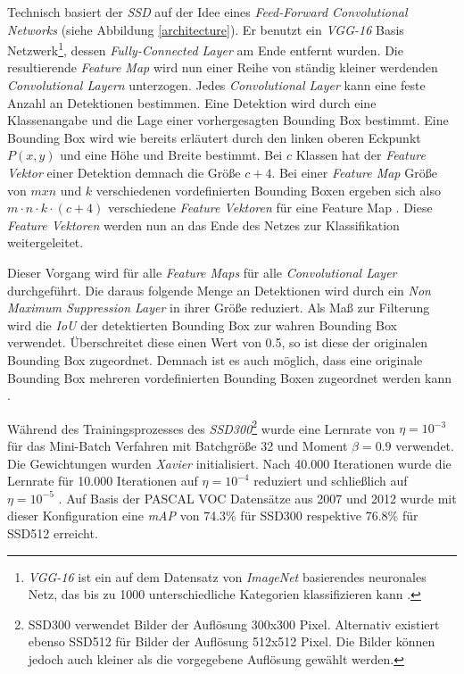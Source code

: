 Technisch basiert der \textit{SSD} auf der Idee eines \textit{Feed-Forward Convolutional Networks} (siehe Abbildung \ref{architecture}). Er benutzt ein \textit{VGG-16} Basis Netzwerk\footnote{\textit{VGG-16} ist ein auf dem Datensatz von \textit{ImageNet} basierendes neuronales Netz, das bis zu 1000 unterschiedliche Kategorien klassifizieren kann \cite{MathWorks.2019b}.}, dessen \textit{Fully-Connected Layer} am Ende entfernt wurden. Die resultierende \textit{Feature Map} wird nun einer Reihe von ständig kleiner werdenden \textit{Convolutional Layern} unterzogen. Jedes \textit{Convolutional Layer} kann eine feste Anzahl an Detektionen bestimmen. Eine Detektion wird durch eine Klassenangabe und die Lage einer vorhergesagten Bounding Box bestimmt. Eine Bounding Box wird wie bereits erläutert durch den linken oberen Eckpunkt $P(x,y)$ und eine Höhe und Breite bestimmt. Bei $c$ Klassen hat der \textit{Feature Vektor} einer Detektion demnach die Größe $c+4$. Bei einer \textit{Feature Map} Größe von $m x n$ und $k$ verschiedenen vordefinierten Bounding Boxen ergeben sich also $m \cdot n \cdot k \cdot (c+4)$ verschiedene \textit{Feature Vektoren} für eine Feature Map \cite{ssd.20161229}. Diese \textit{Feature Vektoren} werden nun an das Ende des Netzes zur Klassifikation weitergeleitet.

Dieser Vorgang wird für alle \textit{Feature Maps} für alle \textit{Convolutional Layer} durchgeführt. Die daraus folgende Menge an Detektionen wird durch ein \textit{Non Maximum Suppression Layer} in ihrer Größe reduziert. Als Maß zur Filterung wird die \textit{IoU} der detektierten Bounding Box zur wahren Bounding Box verwendet. Überschreitet diese einen Wert von 0.5, so ist diese der originalen Bounding Box zugeordnet. Demnach ist es auch möglich, dass eine originale Bounding Box mehreren vordefinierten Bounding Boxen zugeordnet werden kann \cite{ssd.20161229}.

Während des Trainingsprozesses des \textit{SSD300}\footnote{SSD300 verwendet Bilder der Auflösung 300x300 Pixel. Alternativ existiert ebenso SSD512 für Bilder der Auflösung 512x512 Pixel. Die Bilder können jedoch auch kleiner als die vorgegebene Auflösung gewählt werden.} wurde eine Lernrate von $\eta = 10^{-3}$ für das Mini-Batch Verfahren mit Batchgröße 32 und Moment $\beta = 0.9$ verwendet. Die Gewichtungen wurden \textit{Xavier} initialisiert. Nach 40.000 Iterationen wurde die Lernrate für 10.000 Iterationen auf $\eta = 10^{-4}$ reduziert und schließlich auf $\eta = 10^{-5}$ \cite{ssd.20161229}. Auf Basis der PASCAL VOC Datensätze aus 2007 und 2012 wurde mit dieser Konfiguration eine \textit{mAP} von 74.3\% für SSD300 respektive 76.8\% für SSD512 erreicht.
